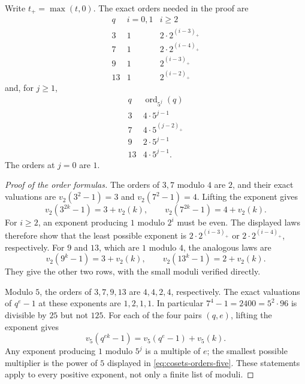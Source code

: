 \documentclass[11pt]{article}
\begin{document}
Write $t_+=\max(t,0)$. The exact orders needed in the proof are
\begin{equation}\label{eq:cosets-orders-two}
\begin{array}{c|c|c}
q& i=0,1&i\ge2\\\hline
3&1&2\cdot2^{(i-3)_+}\\
7&1&2\cdot2^{(i-4)_+}\\
9&1&2^{(i-3)_+}\\
13&1&2^{(i-2)_+}
\end{array}
\end{equation}
and, for $j\ge1$,
\begin{equation}\label{eq:cosets-orders-five}
\begin{array}{c|c}
q&\operatorname{ord}_{5^j}(q)\\\hline
3&4\cdot5^{j-1}\\
7&4\cdot5^{(j-2)_+}\\
9&2\cdot5^{j-1}\\
13&4\cdot5^{j-1}.
\end{array}
\end{equation}
The orders at $j=0$ are $1$.

\begin{proof}[Proof of the order formulas]
The orders of $3,7$ modulo $4$ are $2$, and their exact valuations are
$v_2(3^2-1)=3$ and $v_2(7^2-1)=4$. Lifting the exponent gives
\[
 v_2(3^{2k}-1)=3+v_2(k),\qquad
 v_2(7^{2k}-1)=4+v_2(k).
\]
For $i\ge2$, an exponent producing $1$ modulo $2^i$ must be even.
The displayed laws therefore show that the least possible exponent is
$2\cdot2^{(i-3)_+}$ or $2\cdot2^{(i-4)_+}$, respectively.
For $9$ and $13$, which are $1$ modulo $4$, the analogous laws are
\[
 v_2(9^k-1)=3+v_2(k),\qquad
 v_2(13^k-1)=2+v_2(k).
\]
They give the other two rows, with the small moduli verified directly.

Modulo $5$, the orders of $3,7,9,13$ are $4,4,2,4$, respectively.
The exact valuations of $q^e-1$ at these exponents are $1,2,1,1$.
In particular $7^4-1=2400=5^2\cdot96$ is divisible by $25$ but
not $125$. For each of the four pairs $(q,e)$, lifting the exponent
gives
\[
 v_5(q^{ek}-1)=v_5(q^e-1)+v_5(k).
\]
Any exponent producing $1$ modulo $5^j$ is a multiple of $e$;
the smallest possible multiplier is the power of $5$ displayed in
\eqref{eq:cosets-orders-five}. These statements apply to every
positive exponent, not only a finite list of moduli.
\end{proof}
\end{document}
